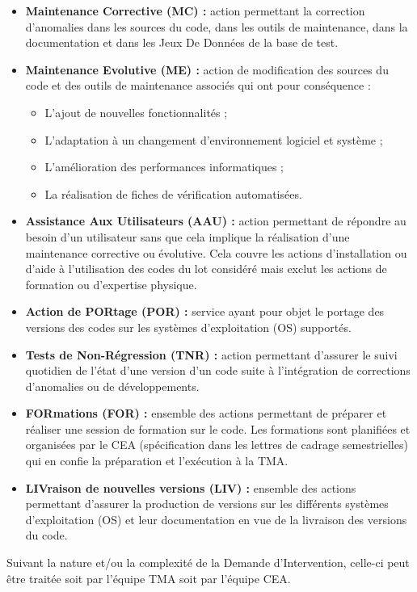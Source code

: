 \begin{itemize}[label=$\Rightarrow$, font=\LARGE]
  \item \textbf{Maintenance Corrective (MC) :} action permettant la correction d'anomalies dans les sources du code, dans les outils de maintenance, dans la documentation et dans les Jeux De Donn\'ees de la base de test.
  \item \textbf{Maintenance Evolutive (ME) :} action de modification des sources du code et des outils de maintenance associ\'es qui ont pour cons\'equence :
  \begin{itemize}
    \item L'ajout de nouvelles fonctionnalit\'es ; 
    \item L'adaptation \`a un changement d'environnement logiciel et syst\`eme ;
    \item L'am\'elioration des performances informatiques ;
    \item La r\'ealisation de fiches de v\'erification automatis\'ees.
  \end{itemize}
  \item \textbf{Assistance Aux Utilisateurs (AAU) :} action permettant de r\'epondre au besoin d'un utilisateur sans que cela implique la r\'ealisation d'une maintenance corrective ou \'evolutive. Cela couvre les actions d'installation ou d'aide \`a l'utilisation des codes du lot consid\'er\'e mais exclut les actions de formation ou d'expertise physique.
  \item \textbf{Action de PORtage (POR) :} service ayant pour objet le portage des versions des codes sur les syst\`emes d'exploitation (OS) support\'es.
  \item \textbf{Tests de Non-R\'egression (TNR) :} action permettant d'assurer le suivi quotidien de l'\'etat d'une version d'un code suite \`a l'int\'egration de corrections d'anomalies ou de d\'eveloppements.
  \item \textbf{FORmations (FOR) :} ensemble des actions permettant de pr\'eparer et r\'ealiser une session de formation sur le code. Les formations sont planifi\'ees et organis\'ees par le CEA (sp\'ecification dans les lettres de cadrage semestrielles) qui en confie la pr\'eparation et l'ex\'ecution \`a la TMA.
  \item \textbf{LIVraison de nouvelles versions (LIV) :} ensemble des actions permettant d'assurer la production de versions sur les diff\'erents syst\`emes d'exploitation (OS) et leur documentation en vue de la livraison des versions du code. 
\end{itemize}\smallskip
Suivant la nature et/ou la complexit\'e de la Demande d'Intervention, celle-ci peut \^etre trait\'ee soit par l'\'equipe TMA soit par l'\'equipe CEA.\smallskip\newline

